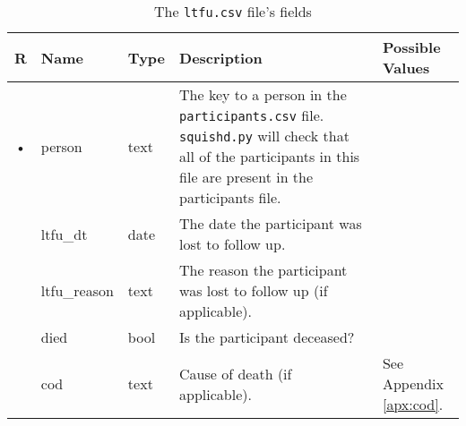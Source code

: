 \documentclass{article}
\begin{document}
\begin{table}
  \centering
  \caption{The \texttt{ltfu.csv} file's fields}
  \label{tbl:ltfu.csv}
  \begin{tabular}{cllp{6cm}p{4cm}}
    R & Name            & Type      & Description & Possible Values \\ \hline
    • & person          & text    & The key to a person in the \texttt{participants.csv}
    file. \texttt{squishd.py} will check that all of the participants in this file
    are present in the participants file. & \\
      & ltfu\_dt        & date      & The date the participant was lost to follow up. & \\
      & ltfu\_reason    & text    & The reason the participant was lost to follow up (if applicable). & \\
      & died            & bool      & Is the participant deceased? & \\
      & cod             & text    & Cause of death (if applicable). & See Appendix \ref{apx:cod}.\\
  \end{tabular}
\end{table}
\end{document}
